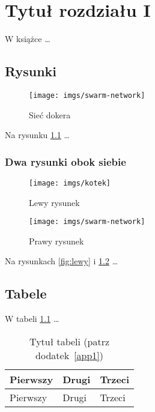 \chapter{Tytuł rozdziału I}

W książce \cite{docker_compose_reference} \dots

\section{Rysunki}

\begin{figure}
	\centering\texttt{[image: imgs/swarm-network]}
	\caption{Sieć dokera \cite{docker_compose_reference}}  \label{rys:network}
\end{figure}

Na rysunku \ref{rys:network} \dots


\subsection{Dwa rysunki obok siebie}

\begin{figure}[ht]
	\centering
	\begin{minipage}[b]{0.45\textwidth}
		\centering\texttt{[image: imgs/kotek]} %
		\caption{Lewy rysunek}\label{fig:lewy}
	\end{minipage}
	\begin{minipage}[b]{0.45\textwidth}
		\centering
		\texttt{[image: imgs/swarm-network]} %
		\caption{Prawy rysunek}\label{fig:prawy}
	\end{minipage}
\end{figure}

Na rysunkach \ref{fig:lewy} i \ref{fig:prawy} \dots


\section{Tabele}

W tabeli \ref{table:table1} \dots

\begin{table}
	\centering\caption{Tytuł tabeli (patrz dodatek~\ref{app1}) \label{table:table1}}
	\begin{tabular}{|l|l|l|}%
		\hline
		Pierwszy & Drugi & Trzeci \\
		\hline
		Pierwszy & Drugi & Trzeci \\
		\hline
	\end{tabular}
\end{table}

